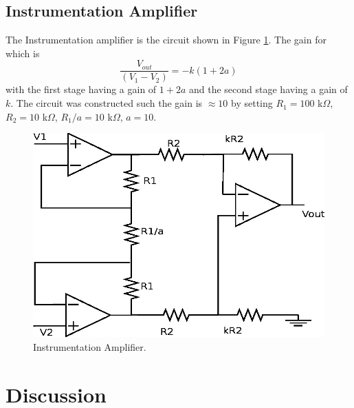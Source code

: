 \documentclass[11pt,onecolumn]{article}
\begin{document}
\subsection{Instrumentation Amplifier}
The Instrumentation amplifier is the circuit shown in Figure \ref{fig:Diagram3}. The gain for which is
%
%
\begin{equation}\label{eq:GainIA}
\frac{V_{out}}{\left( V_1 - V_2 \right)} = -k\left( 1 + 2a \right)
\end{equation}
with the first stage having a gain of $1 + 2a$ and the second stage having a gain of $k$. The circuit was constructed such the gain is $\approx 10$ by setting $R_1 = 100$ k$\Omega$, $R_2 = 10$ k$\Omega$, $R_1/a = 10$ k$\Omega$, $a = 10$.
%
%
\begin{figure}
\center
\includegraphics{Diagram3.eps}
\caption{Instrumentation Amplifier.}\label{fig:Diagram3}
\end{figure}


\section{Discussion}\label{sec:Discussion}
\end{document}
